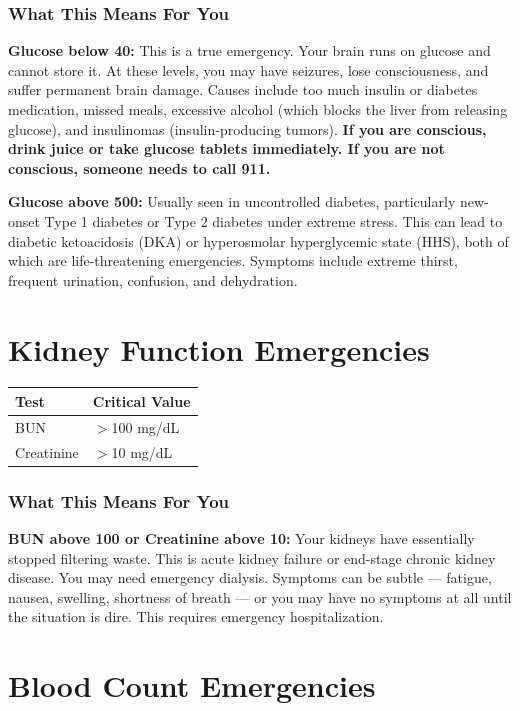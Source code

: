 \subsubsection{What This Means For You}

\textbf{Glucose below 40:} This is a true emergency. Your brain runs on glucose and cannot store it. At these levels, you may have seizures, lose consciousness, and suffer permanent brain damage. Causes include too much insulin or diabetes medication, missed meals, excessive alcohol (which blocks the liver from releasing glucose), and insulinomas (insulin-producing tumors). \textbf{If you are conscious, drink juice or take glucose tablets immediately. If you are not conscious, someone needs to call 911.}

\textbf{Glucose above 500:} Usually seen in uncontrolled diabetes, particularly new-onset Type 1 diabetes or Type 2 diabetes under extreme stress. This can lead to diabetic ketoacidosis (DKA) or hyperosmolar hyperglycemic state (HHS), both of which are life-threatening emergencies. Symptoms include extreme thirst, frequent urination, confusion, and dehydration.

\clearpage
\section{Kidney Function Emergencies}

\begin{longtable}{@{}ll@{}}
\toprule
\textbf{Test} & \textbf{Critical Value} \\
\midrule
BUN & $>$100 mg/dL \\
Creatinine & $>$10 mg/dL \\
\bottomrule
\end{longtable}

\subsubsection{What This Means For You}

\textbf{BUN above 100 or Creatinine above 10:} Your kidneys have essentially stopped filtering waste. This is acute kidney failure or end-stage chronic kidney disease. You may need emergency dialysis. Symptoms can be subtle --- fatigue, nausea, swelling, shortness of breath --- or you may have no symptoms at all until the situation is dire. This requires emergency hospitalization.

\clearpage
\section{Blood Count Emergencies}

